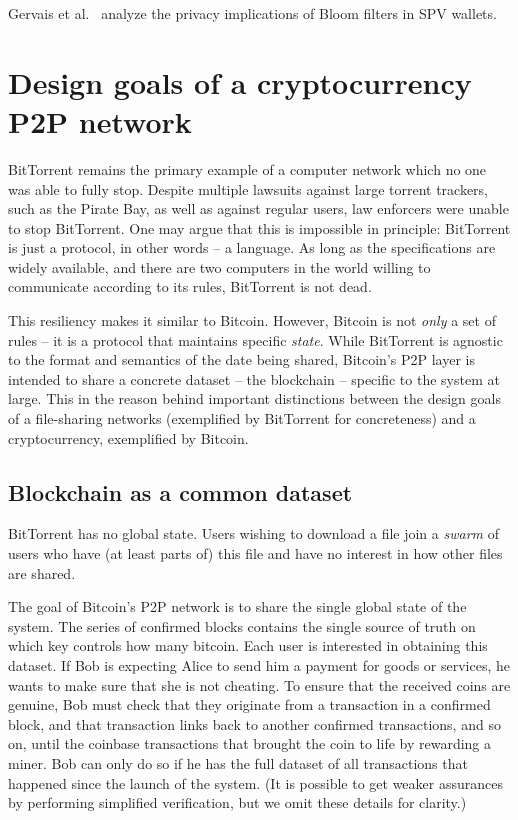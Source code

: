 Gervais et al.~\cite{Gervais2014} analyze the privacy implications of Bloom filters in SPV wallets.






\section{Design goals of a cryptocurrency P2P network}

BitTorrent remains the primary example of a computer network which no one was able to fully stop.
Despite multiple lawsuits against large torrent trackers, such as the Pirate Bay, as well as against regular users, law enforcers were unable to stop BitTorrent.
One may argue that this is impossible in principle: BitTorrent is just a protocol, in other words -- a language.
As long as the specifications are widely available, and there are two computers in the world willing to communicate according to its rules, BitTorrent is not dead.

This resiliency makes it similar to Bitcoin.
However, Bitcoin is not \textit{only} a set of rules -- it is a protocol that maintains specific \textit{state}.
While BitTorrent is agnostic to the format and semantics of the date being shared, Bitcoin's P2P layer is intended to share a concrete dataset -- the blockchain -- specific to the system at large.
This in the reason behind important distinctions between the design goals of a file-sharing networks (exemplified by BitTorrent for concreteness) and a cryptocurrency, exemplified by Bitcoin.


\subsection{Blockchain as a common dataset}

BitTorrent has no global state.
Users wishing to download a file join a \textit{swarm} of users who have (at least parts of) this file and have no interest in how other files are shared.

The goal of Bitcoin's P2P network is to share the single global state of the system.
The series of confirmed blocks contains the single source of truth on which key controls how many bitcoin.
Each user is interested in obtaining this dataset.
If Bob is expecting Alice to send him a payment for goods or services, he wants to make sure that she is not cheating.
To ensure that the received coins are genuine, Bob must check that they originate from a transaction in a confirmed block, and that transaction links back to another confirmed transactions, and so on, until the coinbase transactions that brought the coin to life by rewarding a miner.
Bob can only do so if he has the full dataset of all transactions that happened since the launch of the system.
(It is possible to get weaker assurances by performing simplified verification, but we omit these details for clarity.)

